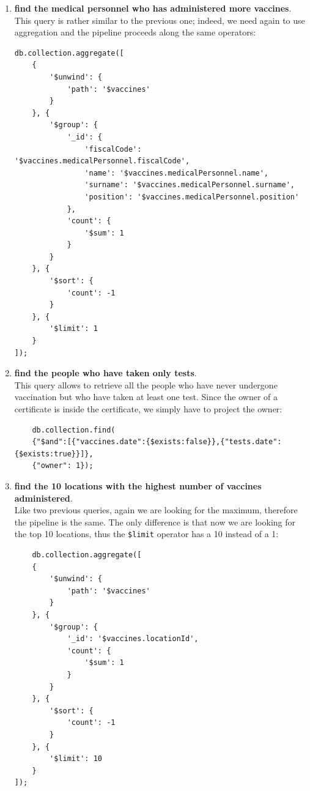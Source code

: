 \documentclass{article}
\begin{document}
\begin{enumerate}
    \begin{lstlisting}
db.collection.aggregate([
    {
        '$unwind': {
            'path': '$vaccines'
        }
    }, {
        '$group': {
            '_id': '$vaccines.type.brandName', 
            'count': {
                '$sum': 1
            }
        }
    }, {
        '$sort': {
            'count': -1
        }
    }, {
        '$limit': 1
    }
]);
    \end{lstlisting}
    \item \textbf{find the medical personnel who has administered more vaccines}.\\This query is rather similar to the previous one; indeed, we need again to use aggregation and the pipeline proceeds along the same operators:
    \begin{lstlisting}
db.collection.aggregate([
    {
        '$unwind': {
            'path': '$vaccines'
        }
    }, {
        '$group': {
            '_id': {
                'fiscalCode': '$vaccines.medicalPersonnel.fiscalCode', 
                'name': '$vaccines.medicalPersonnel.name', 
                'surname': '$vaccines.medicalPersonnel.surname', 
                'position': '$vaccines.medicalPersonnel.position'
            }, 
            'count': {
                '$sum': 1
            }
        }
    }, {
        '$sort': {
            'count': -1
        }
    }, {
        '$limit': 1
    }
]);
\end{lstlisting}
    \item \textbf{find the people who have taken only tests}.\\
    This query allows to retrieve all the people who have never undergone vaccination but who have taken at least one test. Since the owner of a certificate is inside the certificate, we simply have to project the owner: 
    \begin{lstlisting}
    db.collection.find(
	{"$and":[{"vaccines.date":{$exists:false}},{"tests.date":{$exists:true}}]},
	{"owner": 1});
\end{lstlisting}
    \item \textbf{find the 10 locations with the highest number of vaccines administered}.\\
    Like two previous queries, again we are looking for the maximum, therefore the pipeline is the same. The only difference is that now we are looking for the top 10 locations, thus the \verb|$limit| operator has a 10 instead of a 1:
    \begin{lstlisting}
    db.collection.aggregate([
    {
        '$unwind': {
            'path': '$vaccines'
        }
    }, {
        '$group': {
            '_id': '$vaccines.locationId', 
            'count': {
                '$sum': 1
            }
        }
    }, {
        '$sort': {
            'count': -1
        }
    }, {
        '$limit': 10
    }
]);
    \end{lstlisting}
    \end{enumerate}
\end{document}
